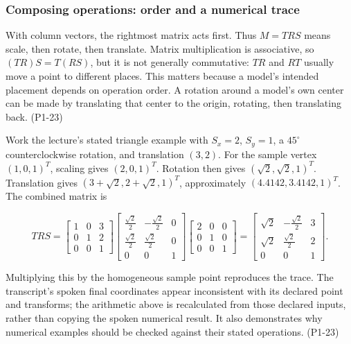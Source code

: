 \subsubsection{Composing operations: order and a numerical trace}\label{03-visual-computing-i-ch001-composing-operations-order-and-a-numerical-trace}

With column vectors, the rightmost matrix acts first. Thus \(M=TRS\) means scale, then rotate, then translate. Matrix multiplication is associative, so \((TR)S=T(RS)\), but it is not generally commutative: \(TR\) and \(RT\) usually move a point to different places. This matters because a model's intended placement depends on operation order. A rotation around a model's own center can be made by translating that center to the origin, rotating, then translating back. (P1-23)

Work the lecture's stated triangle example with \(S_x=2\), \(S_y=1\), a \(45^\circ\) counterclockwise rotation, and translation \((3,2)\). For the sample vertex \((1,0,1)^T\), scaling gives \((2,0,1)^T\). Rotation then gives \((\sqrt2,\sqrt2,1)^T\). Translation gives \((3+\sqrt2,2+\sqrt2,1)^T\), approximately \((4.4142,3.4142,1)^T\). The combined matrix is

\[
TRS=\begin{bmatrix}1&0&3\\0&1&2\\0&0&1\end{bmatrix}
\begin{bmatrix}\frac{\sqrt2}{2}&-\frac{\sqrt2}{2}&0\\\frac{\sqrt2}{2}&\frac{\sqrt2}{2}&0\\0&0&1\end{bmatrix}
\begin{bmatrix}2&0&0\\0&1&0\\0&0&1\end{bmatrix}
=\begin{bmatrix}\sqrt2&-\frac{\sqrt2}{2}&3\\\sqrt2&\frac{\sqrt2}{2}&2\\0&0&1\end{bmatrix}.
\]

Multiplying this by the homogeneous sample point reproduces the trace. The transcript's spoken final coordinates appear inconsistent with its declared point and transforms; the arithmetic above is recalculated from those declared inputs, rather than copying the spoken numerical result. It also demonstrates why numerical examples should be checked against their stated operations. (P1-23)

